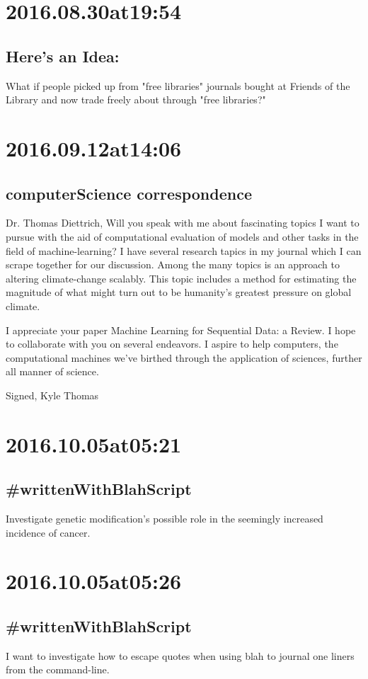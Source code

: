 \section*{ 2016.08.30at19:54 }
\subsection*{Here's an Idea:}
What if people picked up from "free libraries" journals bought at Friends of the Library and now trade freely about through "free libraries?"

\section*{ 2016.09.12at14:06 }
\subsection*{computerScience correspondence}
Dr. Thomas Diettrich,
Will you speak with me about fascinating topics I want to pursue with the aid of computational evaluation of models and other tasks in the field of machine-learning? I have several research tapics in my journal which I can scrape together for our discussion. Among the many topics is an approach to altering climate-change scalably. This topic includes a method for estimating the magnitude of what might turn out to be humanity's greatest pressure on global climate.

I appreciate your paper Machine Learning for Sequential Data: a Review. I hope to collaborate with you on several endeavors. I aspire to help computers, the computational machines we've birthed through the application of sciences, further all manner of science.

Signed,
Kyle Thomas

\section*{ 2016.10.05at05:21 }
\subsection*{\#writtenWithBlahScript }
Investigate genetic modification's possible role in the seemingly increased incidence of cancer.

\section*{ 2016.10.05at05:26 }
\subsection*{\#writtenWithBlahScript }
I want to investigate how to escape quotes when using blah to journal one liners from the command-line.

